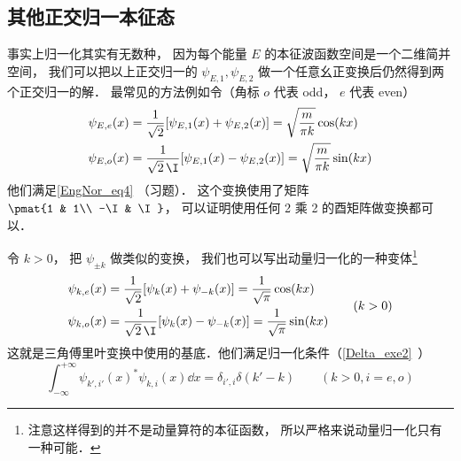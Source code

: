 \subsection{其他正交归一本征态}
事实上归一化其实有无数种， 因为每个能量 $E$ 的本征波函数空间是一个二维简并空间， 我们可以把以上正交归一的 $\psi_{E,1}, \psi_{E,2}$ 做一个任意幺正变换后仍然得到两个正交归一的解． 最常见的方法例如令（角标 $o$ 代表 odd， $e$ 代表 even）
\begin{equation}
\begin{aligned}
\psi_{E,e}(x) &= \frac{1}{\sqrt{2}}[\psi_{E,1}(x) + \psi_{E,2}(x)] = \sqrt{\frac{m}{\pi k}}\cos(kx)\\
\psi_{E,o}(x) &= \frac{1}{\sqrt{2}\,\I}[\psi_{E,1}(x) - \psi_{E,2}(x)] = \sqrt{\frac{m}{\pi k}}\sin(kx)
\end{aligned}
\end{equation}
他们满足\autoref{EngNor_eq4} （习题）． 这个变换使用了矩阵 $\pmat{1 & 1\\ -\I & \I}$， 可以证明使用任何 2 乘 2 的酉矩阵做变换都可以．

令 $k > 0$， 把 $\psi_{\pm k}$ 做类似的变换， 我们也可以写出动量归一化的一种变体\footnote{注意这样得到的并不是动量算符的本征函数， 所以严格来说动量归一化只有一种可能．}
\begin{equation}\label{EngNor_eq5}
\begin{aligned}
\psi_{k,e}(x) &= \frac{1}{\sqrt{2}}[\psi_{k}(x) + \psi_{-k}(x)] = \frac{1}{\sqrt{\pi}}\cos(kx)\\
\psi_{k,o}(x) &= \frac{1}{\sqrt{2}\,\I}[\psi_{k}(x) - \psi_{-k}(x)] = \frac{1}{\sqrt{\pi}}\sin(kx)
\end{aligned}
\qquad (k > 0)
\end{equation}
这就是三角傅里叶变换中使用的基底．他们满足归一化条件（\autoref{Delta_exe2}~）
\begin{equation}\label{EngNor_eq3}
\int_{-\infty}^{+\infty} \psi_{k',i'}(x)^* \psi_{k,i}(x) \dd{x} = \delta_{i',i}\delta(k' - k) \qquad (k > 0, i = e, o)
\end{equation}
